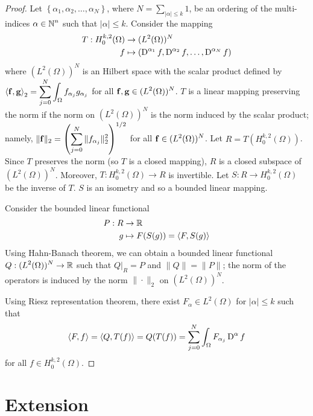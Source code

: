 \begin{proof}
Let $\displaystyle \left\{ \alpha_1, \alpha_2, \ldots, \alpha_N \right\}$,
where $\displaystyle N = \sum_{|\alpha|\leq k} 1$, be an ordering of
the multi-indices $\displaystyle \alpha \in \mathbb{N}^n$ such that $|\alpha|\leq k$.
Consider the mapping
\begin{align*}
T: H^{k,2}_0(\Omega) & \rightarrow (L^2(\Omega))^N \\
f &\mapsto \left( \operatorname{D}^{\alpha_1} f , \operatorname{D}^{\alpha_2} f, \ldots,
\operatorname{D}^{\alpha_N} f \right)
\end{align*}
where $\displaystyle (L^2(\Omega))^N$ is an Hilbert space with the
scalar product defined by
$\displaystyle \left\langle{\mathbf{f}} , {\mathbf{g}}\right\rangle_2 =
\sum_{j=0}^N \int_\Omega f_{\alpha_j} g_{\alpha_j}$
for all $\displaystyle \mathbf{f}, \mathbf{g} \in (L^2(\Omega))^N$.
$T$ is a linear mapping preserving the norm if the norm on
$\displaystyle (L^2(\Omega))^N$ is the norm induced by the scalar
product; namely,
$\displaystyle \| \mathbf{f} \|_2 =
\left( \sum_{j=0}^N \| f_{\alpha_j} \|_2^2 \right)^{1/2}$
for all $\displaystyle \mathbf{f} \in (L^2(\Omega))^N$.
Let $\displaystyle R = T(H^{k,2}_0(\Omega))$.  Since $T$ preserves the
norm (so $T$ is a closed mapping), $R$ is a closed subspace of
$\displaystyle (L^2(\Omega))^N$.  Moreover,
$\displaystyle T:H^{k,2}_0(\Omega) \rightarrow R$ is invertible.  Let
$S:R\rightarrow H^{k,2}_0(\Omega)$ be the inverse of $T$.  $S$ is
an isometry and so a bounded linear mapping.

Consider the bounded linear functional
\begin{align*}
P:R &\rightarrow \mathbb{R} \\
g &\mapsto  F(S(g)) = \left\langle{F} , {S(g)}\right\rangle
\end{align*}
Using Hahn-Banach theorem, we can obtain a bounded linear functional
$\displaystyle Q: (L^2(\Omega))^N \rightarrow \mathbb{R}$ such that
$\displaystyle Q\big|_R = P$ and $\|Q\| = \|P\|$; the norm of the
operators is induced by the norm $\|\cdot\|_2$ on
$\displaystyle (L^2(\Omega))^N$.

Using Riesz representation theorem, there exist
$\displaystyle F_\alpha \in L^2(\Omega)$ for $|\alpha|\leq k$ such that
\[
\left\langle{F} , {f}\right\rangle = \left\langle{Q} , {T(f)}\right\rangle = Q(T(f))
= \sum_{j=0}^N \int_\Omega F_{\alpha_j} \operatorname{D}^\alpha f 
\]
for all $\displaystyle f \in H^{k,2}_0(\Omega)$.
\end{proof}

\section{Extension}


